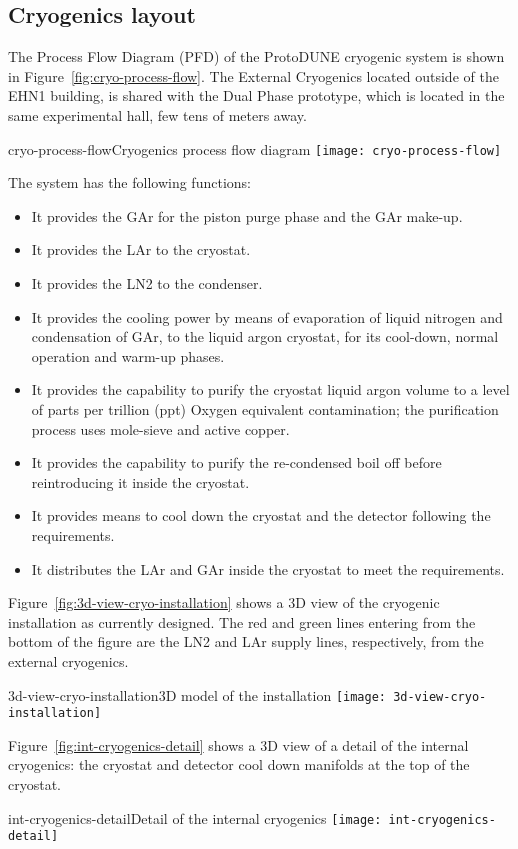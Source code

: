 
\subsection{Cryogenics layout}

The Process Flow Diagram (PFD) of the ProtoDUNE cryogenic system is shown in Figure~\ref{fig:cryo-process-flow}. The External Cryogenics located outside of the EHN1 building, is shared with the Dual Phase prototype, which is located in the same experimental hall, few tens of meters away.

\begin{cdrfigure}{cryo-process-flow}{Cryogenics process flow diagram} 
\texttt{[image: cryo-process-flow]}
\end{cdrfigure}

The system has the following functions:

\begin{itemize}
\item It provides the GAr for the piston purge phase and the GAr make-up.
\item  It provides the LAr to the cryostat.
\item  It provides the LN2 to the condenser.
\item  It provides the cooling power by means of evaporation of liquid nitrogen and condensation of GAr, to the liquid argon cryostat, for its cool-down, normal operation and warm-up phases.
\item  It provides the capability to purify the cryostat liquid argon volume to a level of parts per trillion (ppt) Oxygen equivalent contamination; the purification process uses mole-sieve and active copper.
\item  It provides the capability to purify the re-condensed boil off before reintroducing it inside the cryostat.
\item  It provides means to cool down the cryostat and the detector following the requirements.
\item  It distributes the LAr and GAr inside the cryostat to meet the requirements.
\end{itemize}

Figure~\ref{fig:3d-view-cryo-installation} shows a 3D view of the cryogenic installation as currently designed. The red and green lines entering  from the bottom of the figure are the LN2 and LAr supply lines, respectively, from the external cryogenics.
%
\begin{cdrfigure}{3d-view-cryo-installation}{3D model of the installation } 
\texttt{[image: 3d-view-cryo-installation]}
\end{cdrfigure}
%
Figure~\ref{fig:int-cryogenics-detail} shows a 3D view of a detail of the internal cryogenics: the cryostat and detector cool down manifolds at the top of the cryostat.
%
\begin{cdrfigure}{int-cryogenics-detail}{Detail of the internal cryogenics} 
\texttt{[image: int-cryogenics-detail]}
\end{cdrfigure}

